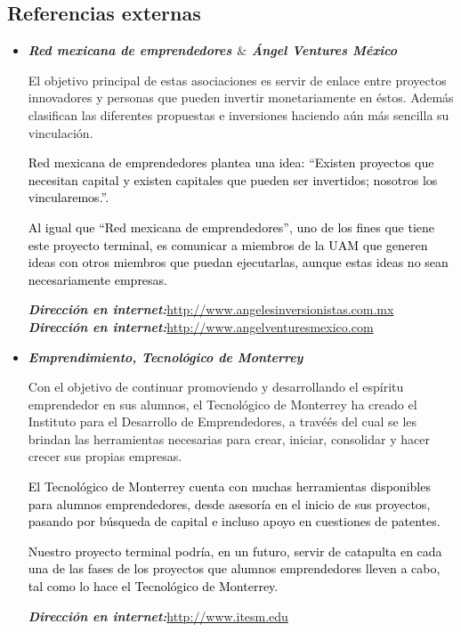 \documentclass[11pt,letterpaper,titlepage]{article}
\begin{document}
\subsection{Referencias externas}
\begin{itemize}
\item \textit{\textbf{Red mexicana de emprendedores $\&$  \'Angel Ventures M\'exico}}

El objetivo principal de estas asociaciones es servir de enlace entre proyectos innovadores y personas que pueden invertir monetariamente en \'estos. Adem\'as clasifican las diferentes propuestas e inversiones haciendo a\'un m\'as sencilla su vinculaci\'on.

\textcolor{black}{Red mexicana de emprendedores plantea una idea: ``Existen proyectos que necesitan capital y existen capitales que pueden ser invertidos; nosotros los vincularemos.''. }


\textcolor{black}{Al igual que ``Red mexicana de emprendedores'', uno de los fines que tiene este proyecto terminal, es comunicar a miembros de la UAM que generen ideas con otros miembros que puedan ejecutarlas, aunque estas ideas no sean necesariamente empresas.}

\textit{\textbf{Direcci\'on en internet:}}\href{http://www.angelesinversionistas.com.mx}{http://www.angelesinversionistas.com.mx}\\
\textit{\textbf{Direcci\'on en internet:}}\href{http://www.angelventuresmexico.com}{http://www.angelventuresmexico.com}


\item \textit{\textbf{Emprendimiento, Tecnol\'ogico de Monterrey}}

Con el objetivo de continuar promoviendo y desarrollando el esp\'iritu emprendedor en sus alumnos, el Tecnol\'ogico de Monterrey ha creado el Instituto para el Desarrollo de Emprendedores, a travé\'es del cual se les brindan las herramientas necesarias para crear, iniciar, consolidar y hacer crecer sus propias empresas. 

\textcolor{black}{El Tecnol\'ogico de Monterrey cuenta con muchas herramientas disponibles para alumnos emprendedores, desde asesor\'ia en el inicio de sus proyectos, pasando por b\'usqueda de capital e incluso apoyo en cuestiones de patentes.}

\textcolor{black}{Nuestro proyecto terminal podr\'ia, en un futuro, servir de catapulta en cada una de las fases de los proyectos que alumnos emprendedores lleven a cabo, tal como lo hace el Tecnol\'ogico de Monterrey.}

\textit{\textbf{Direcci\'on en internet:}}\href{http://www.itesm.edu/wps/wcm/connect/ITESM/Tecnologico+de+Monterrey/Emprendimiento/#2}{http://www.itesm.edu}



\end{itemize}
\end{document}
